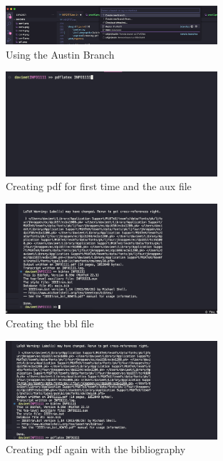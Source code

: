 \documentclass[a4paper, 11pt]{report}
\begin{document}
\begin{figure}[H]
    \centering
    \includegraphics[width=0.7\textwidth]{Austinbranch}
    \caption{Using the Austin Branch}
\end{figure}


\begin{figure}[H]
    \centering
    \includegraphics[width=0.7\textwidth]{proof2}
    \caption{Creating pdf for first time and the aux file}
\end{figure}

\begin{figure}[H]
    \centering
    \includegraphics[width=0.7\textwidth]{proof3}
    \caption{Creating the bbl file}
\end{figure}

\begin{figure}[H]
    \centering
    \includegraphics[width=0.7\textwidth]{proof4}
    \caption{Creating pdf again with the bibliography}
\end{figure}
\end{document}
